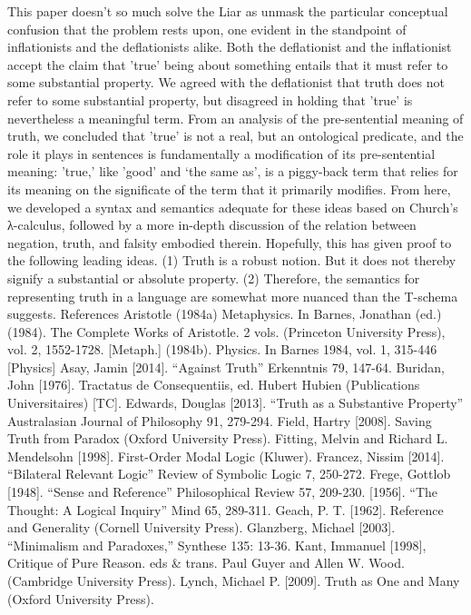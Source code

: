 \documentclass[]{article}
\begin{document}
This paper doesn't so much solve the Liar  as unmask the particular conceptual confusion that the problem rests upon, one evident in the standpoint of inflationists and the deflationists alike. Both the deflationist and the inflationist accept the claim that 'true' being about something entails that it must refer to some substantial property. We agreed with the deflationist that truth does not refer to some substantial property, but disagreed in holding that 'true' is nevertheless a meaningful term. From an analysis of the pre-sentential meaning of truth, we concluded that 'true' is not a real, but an ontological predicate, and the role it plays in sentences is fundamentally a modification of its pre-sentential meaning: 'true,' like 'good' and ‘the same as', is a piggy-back term that relies for its meaning on the significate of the term that it primarily modifies. From here, we developed a syntax and semantics adequate for these ideas based on Church's λ-calculus, followed by a more in-depth discussion of the relation between negation, truth, and falsity embodied therein. Hopefully, this has given proof to the following leading ideas.
(1)	Truth is a robust notion. But it does not thereby signify a substantial or absolute property.
(2)	Therefore, the semantics for representing truth in a language are somewhat more nuanced than the T-schema suggests.
References
Aristotle (1984a) Metaphysics. In Barnes, Jonathan (ed.) (1984). The Complete Works of Aristotle. 2 vols. (Princeton University Press), vol. 2, 1552-1728. [Metaph.]
(1984b). Physics. In Barnes 1984, vol. 1, 315-446 [Physics]
Asay, Jamin [2014]. “Against Truth” Erkenntnis 79, 147-64.
Buridan, John [1976]. Tractatus de Consequentiis, ed. Hubert Hubien (Publications Universitaires) [TC].
Edwards, Douglas [2013]. “Truth as a Substantive Property” Australasian Journal of Philosophy 91, 279-294.
Field, Hartry [2008]. Saving Truth from Paradox (Oxford University Press).
Fitting, Melvin and Richard L. Mendelsohn [1998]. First-Order Modal Logic (Kluwer).
Francez, Nissim [2014]. “Bilateral Relevant Logic” Review of Symbolic Logic 7, 250-272.
Frege, Gottlob [1948]. “Sense and Reference” Philosophical Review 57, 209-230.
[1956]. “The Thought: A Logical Inquiry” Mind 65, 289-311.
Geach, P. T. [1962]. Reference and Generality (Cornell University Press).
Glanzberg, Michael [2003]. “Minimalism and Paradoxes,” Synthese 135: 13-36.
Kant, Immanuel [1998], Critique of Pure Reason. eds & trans. Paul Guyer and Allen W. Wood. (Cambridge University Press).
Lynch, Michael P. [2009]. Truth as One and Many (Oxford University Press). 
\end{document}
